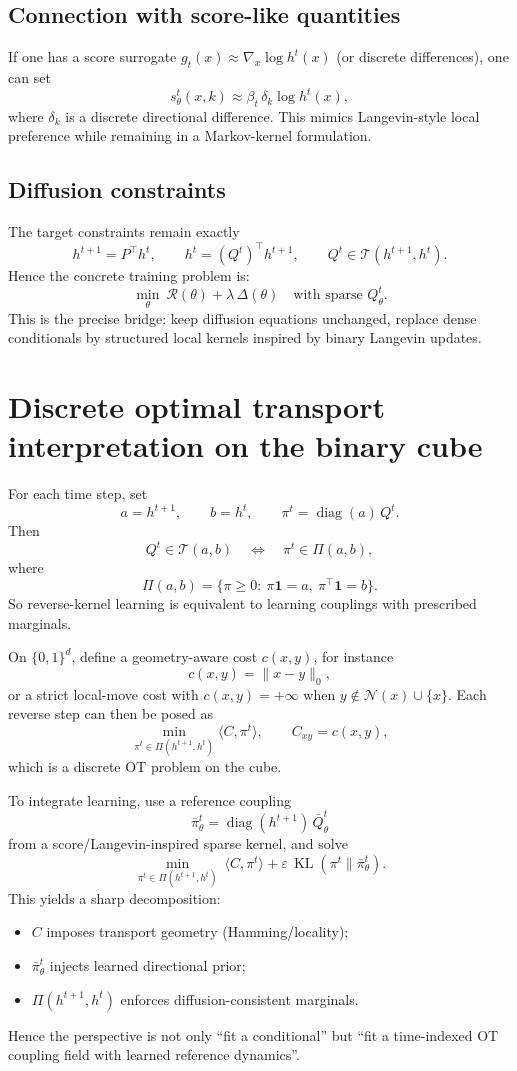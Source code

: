 \documentclass[11pt]{article}
\newcommand{\ones}{\mathbf{1}}
\newcommand{\diag}{\operatorname{diag}}
\newcommand{\KL}{\operatorname{KL}}
\newcommand{\Tset}{\mathcal{T}}
\begin{document}
\subsection*{Connection with score-like quantities}
If one has a score surrogate $g_t(x)\approx \nabla_x \log h^t(x)$ (or discrete differences), one can set
\[
s_\theta^t(x,k)\approx \beta_t\,\delta_k \log h^t(x),
\]
where $\delta_k$ is a discrete directional difference. This mimics Langevin-style local preference while remaining in a Markov-kernel formulation.

\subsection*{Diffusion constraints}
The target constraints remain exactly
\[
h^{t+1}=P^\top h^t,\qquad
h^t=(Q^t)^\top h^{t+1},\qquad
Q^t\in\Tset(h^{t+1},h^t).
\]
Hence the concrete training problem is:
\[
\min_\theta\ \mathcal R(\theta)+\lambda\,\Delta(\theta)
\quad\text{with sparse }Q_\theta^t.
\]
This is the precise bridge: keep diffusion equations unchanged, replace dense conditionals by structured local kernels inspired by binary Langevin updates.

\section{Discrete optimal transport interpretation on the binary cube}

For each time step, set
\[
a=h^{t+1},\qquad b=h^t,\qquad \pi^t=\diag(a)\,Q^t.
\]
Then
\[
Q^t\in\Tset(a,b)
\quad\Longleftrightarrow\quad
\pi^t\in\Pi(a,b),
\]
where
\[
\Pi(a,b)=\{\pi\ge 0:\ \pi\ones=a,\ \pi^\top\ones=b\}.
\]
So reverse-kernel learning is equivalent to learning couplings with prescribed marginals.

On $\{0,1\}^d$, define a geometry-aware cost $c(x,y)$, for instance
\[
c(x,y)=\|x-y\|_0,
\]
or a strict local-move cost with $c(x,y)=+\infty$ when $y\notin \mathcal N(x)\cup\{x\}$.
Each reverse step can then be posed as
\[
\min_{\pi^t\in\Pi(h^{t+1},h^t)} \langle C,\pi^t\rangle,
\qquad C_{xy}=c(x,y),
\]
which is a discrete OT problem on the cube.

To integrate learning, use a reference coupling
\[
\bar\pi_\theta^t=\diag(h^{t+1})\,\bar Q_\theta^t
\]
from a score/Langevin-inspired sparse kernel, and solve
\[
\min_{\pi^t\in\Pi(h^{t+1},h^t)}
\ \langle C,\pi^t\rangle
+\varepsilon\,\KL(\pi^t\|\bar\pi_\theta^t).
\]
This yields a sharp decomposition:
\begin{itemize}
\item $C$ imposes transport geometry (Hamming/locality);
\item $\bar\pi_\theta^t$ injects learned directional prior;
\item $\Pi(h^{t+1},h^t)$ enforces diffusion-consistent marginals.
\end{itemize}
Hence the perspective is not only ``fit a conditional'' but ``fit a time-indexed OT coupling field with learned reference dynamics''.
\end{document}

